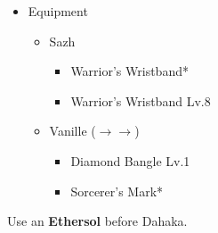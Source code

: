 \begin{menu}
	\begin{itemize}
		\item Equipment
			\begin{itemize}
				\item Sazh
					\begin{itemize}
						\item Warrior's Wristband*
						\item Warrior's Wristband Lv.8
					\end{itemize}
				\item Vanille ($\rightarrow\rightarrow$)
					\begin{itemize}
						\item Diamond Bangle Lv.1
						\item Sorcerer's Mark*
					\end{itemize}
			\end{itemize}
	\end{itemize}
\end{menu}

Use an \textbf{Ethersol} before Dahaka.

